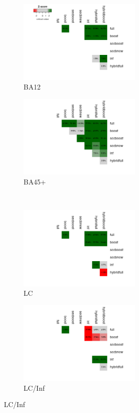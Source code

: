 \documentclass[sn-basic]{sn-jnl}%
\theoremstyle{thmstyleone}%
\theoremstyle{thmstyletwo}%
\theoremstyle{thmstylethree}%
\begin{document}
\begin{figure}
\begin{subfigure}{6cm}
\includegraphics[width=6cm]{ProxyBA12H.png}
\caption{BA12}
\label{heatmapBA12}
\end{subfigure}
\begin{subfigure}{6cm}
\includegraphics[width=6cm]{ProxyNewN.png}
\caption{BA45+}
\label{heatmapBA45}
\end{subfigure}\\
\begin{subfigure}{6cm}
\includegraphics[width=6cm]{LCAllN.png}
\caption{LC}
\label{heatmapLC}
\end{subfigure}
\begin{subfigure}{6cm}
\includegraphics[width=6cm]{LCInfN.png}
\caption{LC/Inf}
\label{heatmapLCINF}
\end{subfigure}
\label{heatmaps}
\end{figure}
\end{document}
